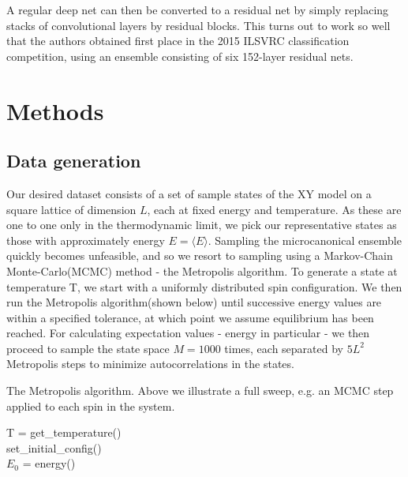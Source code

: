 \documentclass[]{article}
\begin{document}
A regular deep net can then be converted to a residual net by simply replacing stacks of convolutional layers by residual blocks. This turns out to work so well that the authors obtained first place in the 2015 ILSVRC classification competition, using an ensemble consisting of six 152-layer residual nets. 


\section{Methods}

\subsection{Data generation}
Our desired dataset consists of a set of sample states of the XY model on a square lattice of dimension $L$, each at fixed energy and temperature. As these are one to one only in the thermodynamic limit, we pick our representative states as those with approximately energy $E = \langle E \rangle$. Sampling the microcanonical ensemble quickly becomes unfeasible, and so we resort to sampling using a Markov-Chain Monte-Carlo(MCMC) method - the Metropolis algorithm. To generate a state at temperature T, we start with a uniformly distributed spin configuration. We then run the Metropolis algorithm(shown below) until successive energy values are within a specified tolerance, at which point we assume equilibrium has been reached. For calculating expectation values - energy in particular - we then proceed to sample the state space $M = 1000$ times, each separated by $5L^2$ Metropolis steps to minimize autocorrelations in the states.

\begin{algorithm}
	\caption{The Metropolis algorithm. Above we illustrate a full sweep, e.g. an MCMC step applied to each spin in the system.}
	
	T = get\_temperature()\\
	set\_initial\_config()\\
	$E_0$ = energy()\\

\end{algorithm} 
\vspace{5px}
\end{document}

